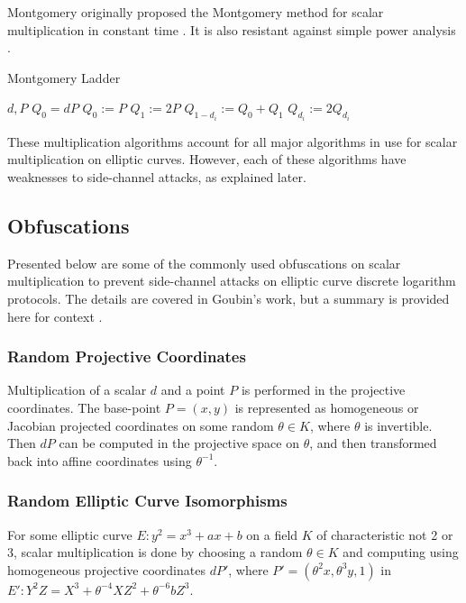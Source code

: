 \documentclass{article}
\let\oldReturn\Return
\renewcommand{\Return}{\State\oldReturn}
\begin{document}
    Montgomery originally proposed the Montgomery method for scalar
    multiplication in constant time \cite{montgomery1987speeding}. It is also
    resistant against simple power analysis \cite{okeya2000power}.

    \begin{algorithm}
        \caption{Montgomery Ladder}
        \label{Montgomery Ladder}
        \begin{algorithmic}
            \Require $d, P$
            \Ensure $Q_0 = dP$
            \State $Q_0 := P$
            \State $Q_1 := 2P$
            \State $Q_{1 - d_i} := Q_0 + Q_1$
            \State $Q_{d_i} := 2Q_{d_i}$
            \EndFor
        \end{algorithmic}
    \end{algorithm}

    These multiplication algorithms account for all major algorithms in use for
    scalar multiplication on elliptic curves. However, each of these algorithms
    have weaknesses to side-channel attacks, as explained later.

\subsection{Obfuscations}
    Presented below are some of the commonly used obfuscations on scalar
    multiplication to prevent side-channel attacks on elliptic curve discrete
    logarithm protocols. The details are covered in Goubin's work, but a
    summary is provided here for context \cite{goubin2003refined}.

\subsubsection{Random Projective Coordinates}
    Multiplication of a scalar $d$ and a point $P$ is performed in the
    projective coordinates. The base-point $P = (x, y)$ is represented as
    homogeneous or Jacobian projected coordinates on some random
    $\theta \in K$, where $\theta$ is invertible. Then $dP$ can be computed in
    the projective space on $\theta$, and then transformed back into affine
    coordinates using $\theta^{-1}$.

\subsubsection{Random Elliptic Curve Isomorphisms}
    For some elliptic curve $E: y^2 = x^3 + ax + b$ on a field $K$ of
    characteristic not 2 or 3, scalar multiplication is done by choosing a
    random $\theta \in K$ and computing using homogeneous projective
    coordinates $dP'$, where $P' = (\theta^2x, \theta^3y, 1)$ in
    $E': Y^2Z = X^3 + \theta^{−4}XZ^2 + \theta^{−6}bZ^3$.
\end{document}
